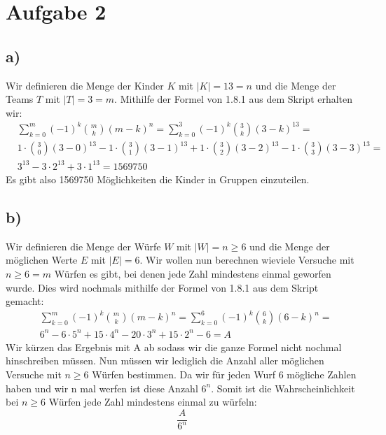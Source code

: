 \section*{Aufgabe 2}
\subsection*{a)}
Wir definieren die Menge der Kinder $K$ mit $ |K|=13=n $ und die Menge der \\
Teams $ T $ mit $ |T|=3=m $. Mithilfe der Formel von 1.8.1 aus dem Skript erhalten wir:
\begin{align*}
  &\sum_{k=0}^{m}(-1) ^{ k } \binom{m}{k}(m-k)^n = \sum_{k=0}^{3}(-1) ^{ k } \binom{3}{k}(3-k)^{13} = \\
  &1\cdot \binom{3}{0}(3-0)^{13} - 1\cdot \binom{3}{1}(3-1)^{13} + 1\cdot \binom{3}{2}(3-2)^{13} - 1\cdot \binom{3}{3}(3-3)^{13} = \\
  &3^{13} - 3\cdot 2^{13} + 3 \cdot 1^{13} = 1569750
\end{align*}
Es gibt also 1569750 Möglichkeiten die Kinder in Gruppen einzuteilen.
\subsection*{b)}
Wir definieren die Menge der Würfe $ W $ mit $|W| = n \ge 6$ und die Menge der möglichen Werte $ E $ mit $ |E|=6 $. Wir wollen nun berechnen wieviele Versuche mit $n\ge 6 = m$ Würfen es gibt, bei denen jede Zahl mindestens einmal geworfen wurde. Dies wird nochmals mithilfe der Formel von 1.8.1 aus dem Skript gemacht:
\begin{align*}
  &\sum_{k=0}^{m}(-1) ^{ k } \binom{m}{k}(m-k)^n = \sum_{k=0}^{6}(-1) ^{ k } \binom{6}{k}(6-k)^n = \\
  &6^n-6\cdot5^n+15\cdot4^n-20\cdot3^n+15\cdot2^n-6 = A
\end{align*}
Wir kürzen das Ergebnis mit A ab sodass wir die ganze Formel nicht nochmal hinschreiben müssen. Nun müssen wir lediglich die Anzahl aller möglichen Versuche mit $ n\ge6 $ Würfen bestimmen. Da wir für jeden Wurf 6 mögliche Zahlen haben und wir n mal werfen ist diese Anzahl $ 6^n $. Somit ist die Wahrscheinlichkeit bei $ n\ge6 $ Würfen jede Zahl mindestens einmal zu würfeln:
\[
  \frac{ A }{ 6^n }
\]
